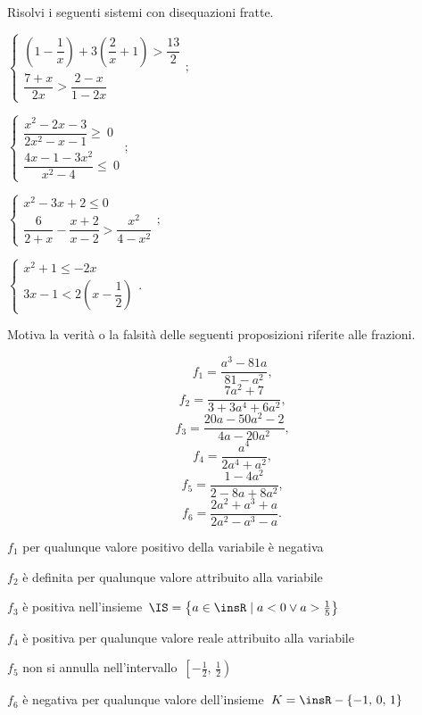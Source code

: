 \begin{esercizio}[\Ast]
\label{ese:18.75}
Risolvi i seguenti sistemi con disequazioni fratte.
\begin{multicols}{2}
\begin{enumeratea}{\longarray
 \item $\left\{\begin{array}{l}
		\left(1-\dfrac{1}{x}\right)+3\left(\dfrac{2}{x}+1\right)>\dfrac{13}{2}\\
		\dfrac{7+x}{2x}>\dfrac{2-x}{1-2x}
   \end{array}\right.;$
\item $\left\{\begin{array}{l}
		\dfrac{x^{2}-2x-3}{2x^{2}-x-1}\ge~0\\
		\dfrac{4x-1-3x^{2}}{x^{2}-4}\le~0
	\end{array}\right.;$
\item $\left\{\begin{array}{l}
		x^{2}-3x+2\le0\\
		\dfrac{6}{2+x}-\dfrac{x+2}{x-2}>\dfrac{x^{2}}{4-x^{2}}
	\end{array}\right.;$
\item $\left\{\begin{array}{l}
		x^{2}+1\le -2x\\
		3x-1<2\left(x-\dfrac{1}{2}\right)
		\end{array}\right..$}
\end{enumeratea}
\end{multicols}
\end{esercizio}

\begin{esercizio}
\label{ese:18.76}
Motiva la verità o la falsità delle seguenti
proposizioni riferite alle frazioni.
\begin{multicols}{3}
\noindent\[f_{1}=\frac{a^{3}-81a}{81-a^{2}}\text{,}\]
\[f_{2}=\frac{7a^{2}+7}{3+3a^{4}+6a^{2}}\text{,}\]
\[f_{3}=\frac{20a-50a^{2}-2}{4a-20a^{2}}\text{,}\]
\[f_{4}=\frac{a^{4}}{2a^{4}+a^{2}}\text{,}\]
\[f_{5}=\frac{1-4a^{2}}{2-8a+8a^{2}}\text{,}\]
\[f_{6}=\frac{2a^{2}+a^{3}+a}{2a^{2}-a^{3}-a}.\]
\end{multicols}
\begin{enumeratea}
\TabPositions{11cm}
\item $f_{1}$ per qualunque valore positivo della variabile è negativa \tab\boxV\quad\boxF
\item $f_{2}$ è definita per qualunque valore attribuito alla variabile \tab\boxV\quad\boxF
\item $f_{3}$ è positiva nell'insieme~$\IS=\left\{a\in \insR\;|\;a<0\vee a>\frac{1}{5}\right\}$ \tab\boxV\quad\boxF
\item $f_{4}$ è positiva per qualunque valore reale attribuito alla variabile \tab\boxV\quad\boxF
\item $f_{5}$ non si annulla nell'intervallo~$\left[-\frac{1}{2}\text{,~}\frac{1}{2}\right)$ \tab\boxV\quad\boxF
\item $f_{6}$ è negativa per qualunque valore dell'insieme~$K=\insR-\{-1\text{,~}0\text{,~}1\}$ \tab\boxV\quad\boxF
\end{enumeratea}
\end{esercizio}

